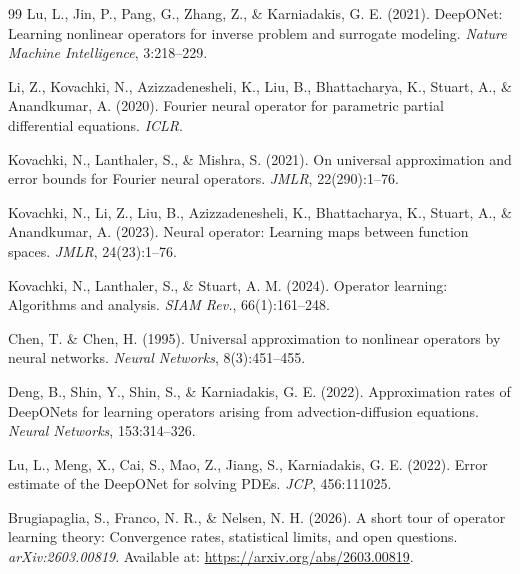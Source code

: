 \documentclass[12pt,a4paper]{article}
\begin{document}
\clearpage
\begin{thebibliography}{99}
     Lu, L., Jin, P., Pang, G., Zhang, Z., \& Karniadakis, G. E. (2021). DeepONet: Learning nonlinear operators for inverse problem and surrogate modeling. \textit{Nature Machine Intelligence}, 3:218--229.

     Li, Z., Kovachki, N., Azizzadenesheli, K., Liu, B., Bhattacharya, K., Stuart, A., \& Anandkumar, A. (2020). Fourier neural operator for parametric partial differential equations. \textit{ICLR}.

     Kovachki, N., Lanthaler, S., \& Mishra, S. (2021). On universal approximation and error bounds for Fourier neural operators. \textit{JMLR}, 22(290):1--76.

     Kovachki, N., Li, Z., Liu, B., Azizzadenesheli, K., Bhattacharya, K., Stuart, A., \& Anandkumar, A. (2023). Neural operator: Learning maps between function spaces. \textit{JMLR}, 24(23):1--76.

     Kovachki, N., Lanthaler, S., \& Stuart, A. M. (2024). Operator learning: Algorithms and analysis. \textit{SIAM Rev.}, 66(1):161--248.

     Chen, T. \& Chen, H. (1995). Universal approximation to nonlinear operators by neural networks. \textit{Neural Networks}, 8(3):451--455.

     Deng, B., Shin, Y., Shin, S., \& Karniadakis, G. E. (2022). Approximation rates of DeepONets for learning operators arising from advection-diffusion equations. \textit{Neural Networks}, 153:314--326.

     Lu, L., Meng, X., Cai, S., Mao, Z., Jiang, S., Karniadakis, G. E. (2022). Error estimate of the DeepONet for solving PDEs. \textit{JCP}, 456:111025.

     Brugiapaglia, S., Franco, N. R., \& Nelsen, N. H. (2026). A short tour of operator learning theory: Convergence rates, statistical limits, and open questions. \textit{arXiv:2603.00819}. Available at: \url{https://arxiv.org/abs/2603.00819}.


\end{thebibliography}
\end{document}
